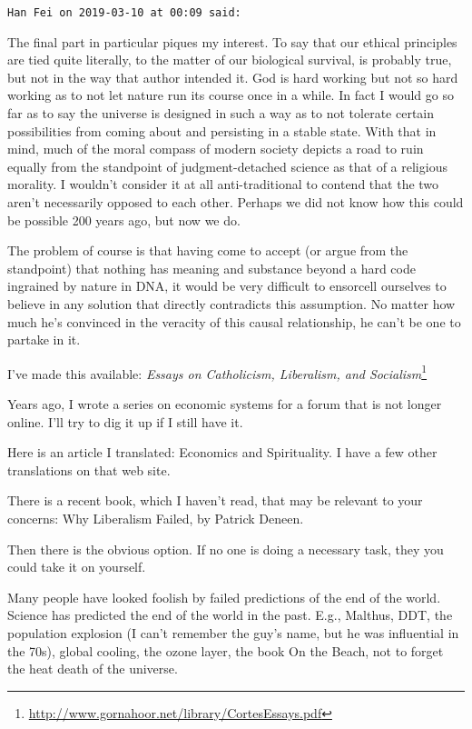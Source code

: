 \begin{footnotesize}\begin{sffamily}



\texttt{Han Fei on 2019-03-10 at 00:09 said: }

The final part in particular piques my interest. To say that our ethical principles are tied quite literally, to the matter of our biological survival, is probably true, but not in the way that author intended it. God is hard working but not so hard working as to not let nature run its course once in a while. In fact I would go so far as to say the universe is designed in such a way as to not tolerate certain possibilities from coming about and persisting in a stable state. With that in mind, much of the moral compass of modern society depicts a road to ruin equally from the standpoint of judgment-detached science as that of a religious morality. I wouldn't consider it at all anti-traditional to contend that the two aren't necessarily opposed to each other. Perhaps we did not know how this could be possible 200 years ago, but now we do.

The problem of course is that having come to accept (or argue from the standpoint) that nothing has meaning and substance beyond a hard code ingrained by nature in DNA, it would be very difficult to ensorcell ourselves to believe in any solution that directly contradicts this assumption. No matter how much he's convinced in the veracity of this causal relationship, he can't be one to partake in it.


\hfill

I've made this available: \textit{Essays on Catholicism, Liberalism, and Socialism}\footnote{\url{http://www.gornahoor.net/library/CortesEssays.pdf}}

Years ago, I wrote a series on economic systems for a forum that is not longer online. I'll try to dig it up if I still have it.

Here is an article I translated: Economics and Spirituality. I have a few other translations on that web site.

There is a recent book, which I haven't read, that may be relevant to your concerns: Why Liberalism Failed, by Patrick Deneen.

Then there is the obvious option. If no one is doing a necessary task, they you could take it on yourself.

Many people have looked foolish by failed predictions of the end of the world. Science has predicted the end of the world in the past. E.g., Malthus, DDT, the population explosion (I can't remember the guy's name, but he was influential in the 70s), global cooling, the ozone layer, the book On the Beach, not to forget the heat death of the universe.


\end{sffamily}
\end{footnotesize}
